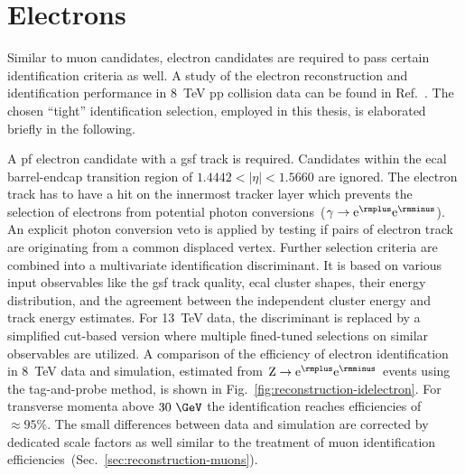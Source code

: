 \section{Electrons}
\label{sec:reconstruction-electrons}

Similar to muon candidates, electron candidates are required to pass certain identification criteria as well. A study of the electron reconstruction and identification performance in 8~TeV pp collision data can be found in Ref.~\cite{Khachatryan:2015hwa}. The chosen ``tight'' identification selection, employed in this thesis, is elaborated briefly in the following.

A \gls{pf} electron candidate with a \gls{gsf} track is required. Candidates within the \gls{ecal} barrel-endcap transition region of $1.4442<|\eta|<1.5660$ are ignored. The electron track has to have a hit on the innermost tracker layer which prevents the selection of electrons from potential photon conversions~($\gamma\to\mathrm{e}^{\rmplus}\mathrm{e}^{\rmminus}$). An explicit photon conversion veto is applied by testing if pairs of electron track are originating from a common displaced vertex. Further selection criteria are combined into a multivariate identification discriminant. It is based on various input observables like the \gls{gsf} track quality, \gls{ecal} cluster shapes, their energy distribution, and the agreement between the independent cluster energy and track energy estimates. For 13~TeV data, the discriminant is replaced by a simplified cut-based version where multiple fined-tuned selections on similar observables are utilized. A comparison of the efficiency of electron identification in 8~TeV data and simulation, estimated from $\mathrm{Z}\to\mathrm{e}^{\rmplus}\mathrm{e}^{\rmminus}$ events using the tag-and-probe method, is shown in Fig.~\ref{fig:reconstruction-idelectron}. For transverse momenta above $30~\GeV$ the identification reaches efficiencies of $\approx95\%$. The small differences between data and simulation are corrected by dedicated scale factors as well similar to the treatment of muon identification efficiencies~(Sec.~\ref{sec:reconstruction-muons}).


